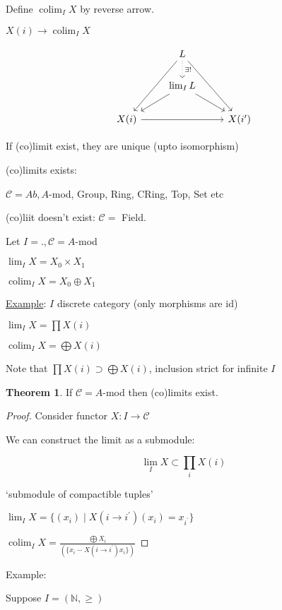 \documentclass{article}
\theoremstyle{definition}
\newtheorem{theorem}{Theorem}
\begin{document}
Define \(\operatorname{colim}_I X\) by reverse arrow.

\(X(i)\longrightarrow \operatorname{colim}_I X \)

\[
    \begin{tikzcd}
        & L \ar[ldd] \ar[rdd] \ar[d, "\exists!", dotted] & \\
        & \lim_I L \ar[dl] \ar[dr] & \\
        X(i) \ar[rr] & & X(i^{\prime})
    \end{tikzcd}
\]

If (co)limit exist, they are unique (upto isomorphism)

(co)limits exists:

\(\mathcal{C} = Ab, A\)-mod, Group, Ring, CRing, Top, Set etc

(co)liit doesn't exist: \(\mathcal{C}=\) Field. 

Let \(I = ., \mathcal{C} = A\)-mod

\(\lim_I X = X_0 \times X_1\)

\(\operatorname{colim}_I X = X_0 \oplus X_1 \) 

\underline{Example}: \(I\) discrete category (only morphisms are id)

\(\lim_I X = \prod X(i)\)

\(\operatorname{colim}_I X = \bigoplus X(i) \) 

Note that \(\prod X(i) \supset \bigoplus X(i)\), inclusion strict for infinite \(I\) 

\begin{theorem}
    If \(\mathcal{C} = A\)-mod then (co)limits exist. 
\end{theorem}

\begin{proof}
    Consider functor \(X : I \to \mathcal{C}\)
    
    We can construct the limit as a submodule:

    \[
        \lim_I X \subset \prod_i X(i)
    \]

    `submodule of compactible tuples'

    \(\lim_I X = \{ (x_i) \mid X(i \to i^{\prime})(x_i)=x_{i^{\prime}} \}\)
    
    \(\operatorname{colim}_I X = \frac{\bigoplus X_i}{(\{ x_i - X(i \to i^{\prime})x_i \} )} \) 
    

\end{proof}

Example:

Suppose \(I =(\mathbb{N} , \geq)\) 
\end{document}
